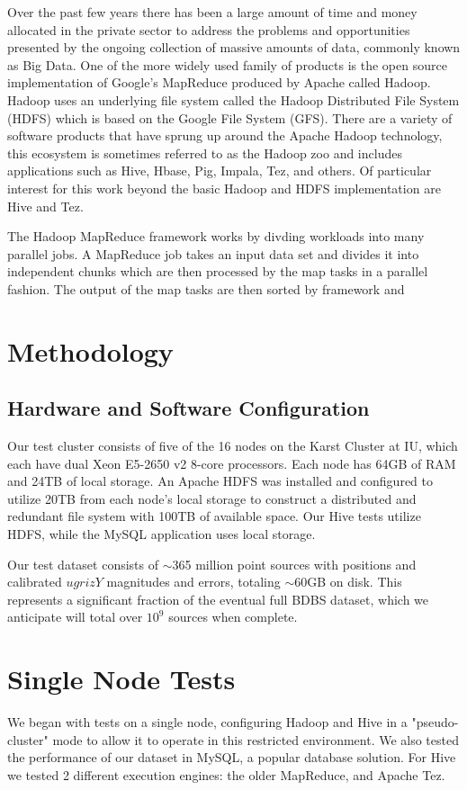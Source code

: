 \documentclass[11pt,twoside]{article}
\begin{document}
Over the past few years there has been a large amount of time and money allocated in the private sector to
address the problems and opportunities presented by the ongoing collection of massive amounts of data,
commonly known as Big Data. One of the more widely used family of products is the open source implementation
of Google's MapReduce produced by Apache called Hadoop\cite{ref:hadoop}. Hadoop uses an underlying file system called the
Hadoop Distributed File System (HDFS) which is based on the Google File System (GFS). There are a variety of
software products that have sprung up around the Apache Hadoop technology, this ecosystem is sometimes
referred to as the Hadoop zoo and includes applications such as Hive, Hbase, Pig, Impala, Tez, and others. Of
particular interest for this work beyond the basic Hadoop and HDFS implementation are Hive and Tez.

The Hadoop MapReduce framework works by divding workloads into many parallel jobs. A MapReduce job takes an
input data set and divides it into independent chunks which are then processed by the map tasks in a parallel
fashion. The output of the map tasks are then sorted by framework and 



\section{Methodology}

\subsection{Hardware and Software Configuration}

Our test cluster consists of five of the 16 nodes on the Karst Cluster at IU, which each have dual Xeon
E5-2650 v2 8-core processors. Each node has 64GB of RAM and 24TB of local storage. An Apache HDFS was installed and configured to utilize 20TB from each node's local storage to construct a distributed and redundant file system with 100TB of available space.  Our Hive tests utilize HDFS, while the MySQL application uses local storage.  

Our test dataset consists of $\sim$365 million point sources with positions and calibrated $ugrizY$ magnitudes and errors, totaling $\sim$60GB on disk.  This represents a significant fraction of the eventual full BDBS dataset, which we anticipate will total over $10^9$ sources when complete.

\section{Single Node Tests}
We began with tests on a single node, configuring Hadoop and Hive in a "pseudo-cluster" mode to allow it to operate in this restricted environment.  We also tested the performance of our dataset in MySQL, a popular database solution.  For Hive we tested 2 different execution engines: the older MapReduce, and Apache Tez.  
\end{document}
